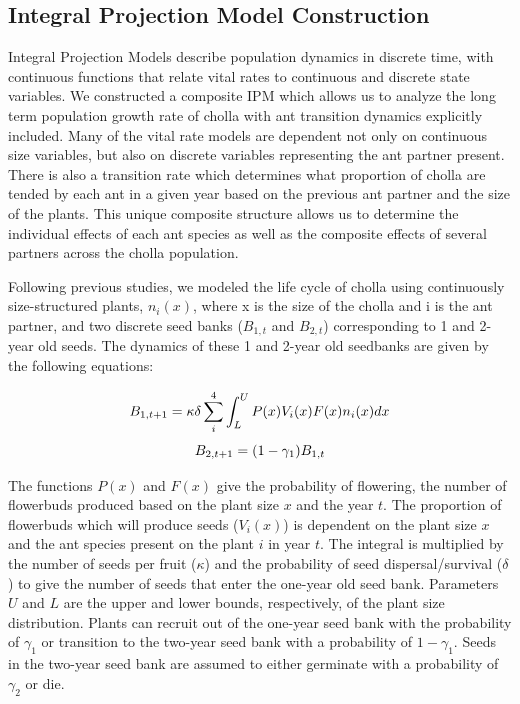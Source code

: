 \documentclass[12pt,a4paper]{article}
\begin{document}
\subsection*{Integral Projection Model Construction}
Integral Projection Models describe population dynamics in discrete time, with continuous functions that relate vital rates to continuous and discrete state variables. 
We constructed a composite IPM which allows us to analyze the long term population growth rate of cholla with ant transition dynamics explicitly included.
Many of the vital rate models are dependent not only on continuous size variables, but also on discrete variables representing the ant partner present.
There is also a transition rate which determines what proportion of cholla are tended by each ant in a given year based on the previous ant partner and the size of the plants. 
This unique composite structure allows us to determine the individual effects of each ant species as well as the composite effects of several partners across the cholla population. 

Following previous studies, we modeled the life cycle of cholla using continuously size-structured plants, $n_i(x)$, where x is the size of the cholla and i is the ant partner, and two discrete seed banks ($B_{1,t}$ and $B_{2,t}$) corresponding to 1 and 2-year old seeds.
The dynamics of these 1 and 2-year old seedbanks are given by the following equations: 

		$$
		B_{1, t+1} = \kappa \delta \sum_{i}^{4} \int_L^U P(x) V_i(x) F(x) n_i(x) dx \\
		$$
		$$
		B_{2,t+1} =  (1 - \gamma_1)B_{1,t}\\
		$$
		
The functions $P(x)$ and $F(x)$ give the probability of flowering, the number of flowerbuds produced based on the plant size $x$ and the year $t$. 
The proportion of flowerbuds which will produce seeds ($V_i(x)$) is dependent on the plant size $x$ and the ant species present on the plant $i$ in year $t$. 
The integral is multiplied by the number of seeds per fruit ($\kappa$) and the probability of seed dispersal/survival ($\delta$) to give the number of seeds that enter the one-year old seed bank. 
Parameters $U$ and $L$ are the upper and lower bounds, respectively, of the plant size distribution. 
Plants can recruit out of the one-year seed bank with the probability of $\gamma_1$ or transition to the two-year seed bank with a probability of $1 - \gamma_1$. 
Seeds in the two-year seed bank are assumed to either germinate with a probability of $\gamma_2$ or die. 
		
\end{document}
